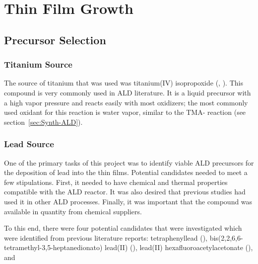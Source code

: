 \chapter{Thin Film Growth}
\label{ch:SampFab}
\thispagestyle{empty}



\section{Precursor Selection}
\label{sec:SampFab-Precursors}

\lipsum

\subsection{Titanium Source}

The source of titanium that was used was titanium(IV) isopropoxide (\TiOiPr{}, ). This compound is very commonly used in ALD literature. It is a liquid precursor with a high vapor pressure and reacts easily with most oxidizers; the most commonly used oxidant for this reaction is water vapor, similar to the TMA- reaction (see section~\vref{sec:Synth-ALD}). 

\subsection{Lead Source}

One of the primary tasks of this project was to identify viable ALD precursors for the deposition of lead into the thin films. Potential candidates needed to meet a few stipulations. First, it needed to have chemical and thermal properties compatible with the ALD reactor. It was also desired that previous studies had used it in other ALD processes. Finally, it was important that the compound was available in quantity from chemical suppliers. 

To this end, there were four potential candidates that were investigated which were identified from previous literature reports: tetraphenyllead (), bis(2,2,6,6-tetramethyl-3,5-heptanedionato) lead(II) (), lead(II) hexafluoroacetylacetonate (), and  

